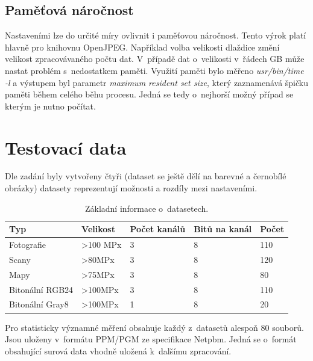 \subsection*{Paměťová náročnost}
Nastaveními lze do určité míry ovlivnit i paměťovou náročnost. Tento výrok platí hlavně pro knihovnu OpenJPEG. Například volba velikosti dlaždice změní velikost zpracovávaného počtu dat. V~případě dat o~velikosti v~řádech GB může nastat problém s~nedostatkem paměti. Využití paměti bylo měřeno \textit{usr/bin/time -l} a výstupem byl parametr \textit{maximum resident set size}, který zaznamenává špičku paměti během celého běhu procesu. Jedná se tedy o~nejhorší možný případ se kterým je nutno počítat.
\newpage
\section{Testovací data}
Dle zadání byly vytvořeny čtyři (dataset  se ještě dělí na barevné a černobílé obrázky) datasety reprezentují možnosti a rozdíly mezi nastaveními.

\begin{table}[ht!]
  \centering
    \setlength{\tabcolsep}{3pt} %
    \renewcommand{\arraystretch}{1.15} %

    \begin{tabular}{|p{3.5cm}|p{3cm}|p{3cm}|p{3cm}|p{1.5cm}|}
      \hline
      \textbf{Typ} & \textbf{Velikost} & \textbf{Počet kanálů} & \textbf{Bitů na kanál} & \textbf{Počet} \\ 
      \hline

      Fotografie      & >100 MPx   & 3   & 8 & 110 \\ 
      Scany           & >80MPx     & 3   & 8   & 120 \\ 
      Mapy            & >75MPx     & 3   & 8   & 80 \\ 
      Bitonální RGB24 & >100MPx    & 3  & 8   & 110 \\ 
      Bitonální Gray8 & >100MPx    & 1  & 8   & 20 \\ 
      \hline
    \end{tabular}
    \caption{Základní informace o~datasetech.} 
\end{table}

Pro statisticky významné měření obsahuje každý z~datasetů alespoň 80 souborů. Jsou uloženy v~formátu PPM/PGM ze specifikace Netpbm. Jedná se o~formát obsahující surová data vhodně uložená k~dalšímu zpracování.\\

